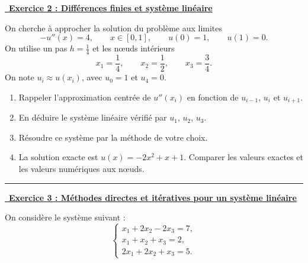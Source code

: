 \vspace{1em}

\underline{\, \bf{Exercice 2 : Différences finies et système linéaire}}
\medskip

On cherche à approcher la solution du problème aux limites
\[
-u''(x)=4,\qquad x\in[0,1],
\qquad u(0)=1,\qquad u(1)=0.
\]
On utilise un pas $h=\frac14$ et les n\oe{}uds intérieurs
\[
x_1=\frac14,\qquad x_2=\frac12,\qquad x_3=\frac34.
\]
On note $u_i \approx u(x_i)$, avec $u_0=1$ et $u_4=0$.

\begin{enumerate}
    \item Rappeler l'approximation centrée de $u''(x_i)$ en fonction de $u_{i-1}$, $u_i$ et $u_{i+1}$.
    \item En déduire le système linéaire vérifié par $u_1$, $u_2$, $u_3$.
    \item Résoudre ce système par la méthode de votre choix.
    \item La solution exacte est $u(x)=-2x^2+x+1$. Comparer les valeurs exactes et les valeurs numériques aux n\oe{}uds.
\end{enumerate}

\hfill\break
\hrule
\hfill\break

\underline{\, \bf{Exercice 3 : Méthodes directes et itératives pour un système linéaire}}
\medskip

On considère le système suivant :
\[
\begin{cases}
x_1+2x_2-2x_3 = 7,\\
x_1+x_2+x_3 = 2,\\
2x_1+2x_2+x_3 = 5.
\end{cases}
\]

